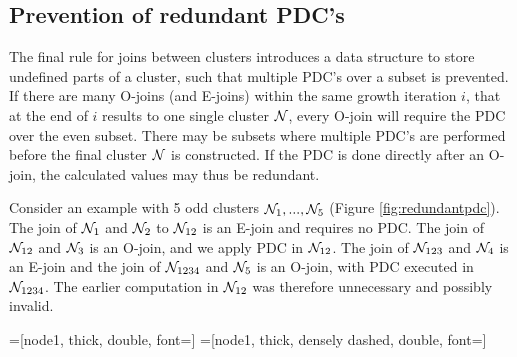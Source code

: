 \subsection{Prevention of redundant PDC's}\label{sec:multiplejoint}
The final rule for joins between clusters introduces a data structure to store undefined parts of a cluster, such that multiple PDC's over a subset is prevented. If there are many O-joins (and E-joins) within the same growth iteration $i$, that at the end of $i$ results to one single cluster $\mathcal{N}$, every O-join will require the PDC over the even subset. There may be subsets where multiple PDC's are performed before the final cluster $\mathcal{N}$ is constructed. If the PDC is done directly after an O-join, the calculated values may thus be redundant.

Consider an example with 5 odd clusters $\mathcal{N}_1, ...,  \mathcal{N}_5$ (Figure \ref{fig:redundantpdc}). The join of $\mathcal{N}_1$ and $\mathcal{N}_2$ to $\mathcal{N}_{12}$ is an E-join and requires no PDC. The join of $\mathcal{N}_{12}$ and $\mathcal{N}_3$ is an O-join, and we apply PDC in $\mathcal{N}_{12}$. The join of $\mathcal{N}_{123}$ and $\mathcal{N}_4$ is an E-join and the join of $\mathcal{N}_{1234}$ and $\mathcal{N}_5$ is an O-join, with PDC executed in $\mathcal{N}_{1234}$. The earlier computation in $\mathcal{N}_{12}$ was therefore unnecessary and possibly invalid.

=[node1, thick, double, font=\footnotesize]
=[node1, thick, densely dashed, double, font=\footnotesize]

